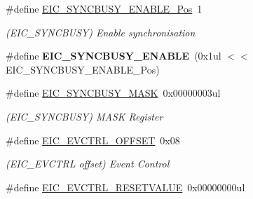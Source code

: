 \begin{DoxyCompactItemize}
\item 
\hypertarget{group___s_a_m_l21___e_i_c_ga81e1ca9fe8b4a63049445f836a13f0c7}{}\#define \hyperlink{group___s_a_m_l21___e_i_c_ga81e1ca9fe8b4a63049445f836a13f0c7}{E\+I\+C\+\_\+\+S\+Y\+N\+C\+B\+U\+S\+Y\+\_\+\+E\+N\+A\+B\+L\+E\+\_\+\+Pos}~1\label{group___s_a_m_l21___e_i_c_ga81e1ca9fe8b4a63049445f836a13f0c7}

\begin{DoxyCompactList}\small\item\em (E\+I\+C\+\_\+\+S\+Y\+N\+C\+B\+U\+S\+Y) Enable synchronisation \end{DoxyCompactList}\item 
\hypertarget{group___s_a_m_l21___e_i_c_ga160e0633c2a7f5f9588ff9b9516ab527}{}\#define {\bfseries E\+I\+C\+\_\+\+S\+Y\+N\+C\+B\+U\+S\+Y\+\_\+\+E\+N\+A\+B\+L\+E}~(0x1ul $<$$<$ E\+I\+C\+\_\+\+S\+Y\+N\+C\+B\+U\+S\+Y\+\_\+\+E\+N\+A\+B\+L\+E\+\_\+\+Pos)\label{group___s_a_m_l21___e_i_c_ga160e0633c2a7f5f9588ff9b9516ab527}

\item 
\hypertarget{group___s_a_m_l21___e_i_c_ga568a8dccaced2d98cf62355f017f193d}{}\#define \hyperlink{group___s_a_m_l21___e_i_c_ga568a8dccaced2d98cf62355f017f193d}{E\+I\+C\+\_\+\+S\+Y\+N\+C\+B\+U\+S\+Y\+\_\+\+M\+A\+S\+K}~0x00000003ul\label{group___s_a_m_l21___e_i_c_ga568a8dccaced2d98cf62355f017f193d}

\begin{DoxyCompactList}\small\item\em (E\+I\+C\+\_\+\+S\+Y\+N\+C\+B\+U\+S\+Y) M\+A\+S\+K Register \end{DoxyCompactList}\item 
\hypertarget{group___s_a_m_l21___e_i_c_ga1e9f53fbff309ef9b2ecfa6276b72f15}{}\#define \hyperlink{group___s_a_m_l21___e_i_c_ga1e9f53fbff309ef9b2ecfa6276b72f15}{E\+I\+C\+\_\+\+E\+V\+C\+T\+R\+L\+\_\+\+O\+F\+F\+S\+E\+T}~0x08\label{group___s_a_m_l21___e_i_c_ga1e9f53fbff309ef9b2ecfa6276b72f15}

\begin{DoxyCompactList}\small\item\em (E\+I\+C\+\_\+\+E\+V\+C\+T\+R\+L offset) Event Control \end{DoxyCompactList}\item 
\hypertarget{group___s_a_m_l21___e_i_c_gaa55f28b19d883994bcd6ade4425eea0a}{}\#define \hyperlink{group___s_a_m_l21___e_i_c_gaa55f28b19d883994bcd6ade4425eea0a}{E\+I\+C\+\_\+\+E\+V\+C\+T\+R\+L\+\_\+\+R\+E\+S\+E\+T\+V\+A\+L\+U\+E}~0x00000000ul\label{group___s_a_m_l21___e_i_c_gaa55f28b19d883994bcd6ade4425eea0a}


\end{DoxyCompactItemize}

